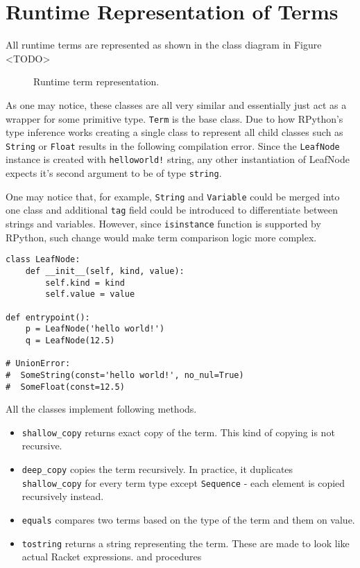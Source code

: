\section{Runtime Representation of Terms}

All runtime terms are represented as shown in the class diagram in Figure <TODO>

\begin{figure}[H]
	\centering
\caption{Runtime term representation.}
\label{class-diagram-runtime-term}
\end{figure}

As one may notice, these classes are all very similar and essentially just act as a wrapper for some primitive type. \texttt{Term} is the base class. Due to how RPython's type inference works creating a single class to represent all child classes such as \texttt{String} or \texttt{Float} results in the following compilation error.  Since the \texttt{LeafNode} instance is created with \texttt{helloworld!} string, any other instantiation of LeafNode expects it's second argument to be of type \texttt{string}. 

One may notice that, for example, \texttt{String} and \texttt{Variable} could be merged into one class and additional \texttt{tag} field could be introduced to differentiate between strings and variables. However, since \texttt{isinstance} function is supported by RPython, such change would make term comparison logic more complex.

\begin{lstlisting}
class LeafNode:
    def __init__(self, kind, value):
        self.kind = kind 
        self.value = value

def entrypoint():
    p = LeafNode('hello world!')
    q = LeafNode(12.5)

# UnionError:
#  SomeString(const='hello world!', no_nul=True)
#  SomeFloat(const=12.5)
\end{lstlisting}

All the classes implement following methods.
\begin{itemize}
\item \texttt{shallow\_copy} returns exact copy of the term. This kind of copying is not recursive.
\item
\texttt{deep\_copy} copies the term recursively. In practice, it duplicates \texttt{shallow\_copy} for every term type except \texttt{Sequence} - each element is copied recursively instead.

\item
\texttt{equals} compares two terms based on the type of the term and them on value.
\item
\texttt{tostring} returns a string representing the term. These are made to look like actual Racket expressions.
and procedures
\end{itemize}
 
